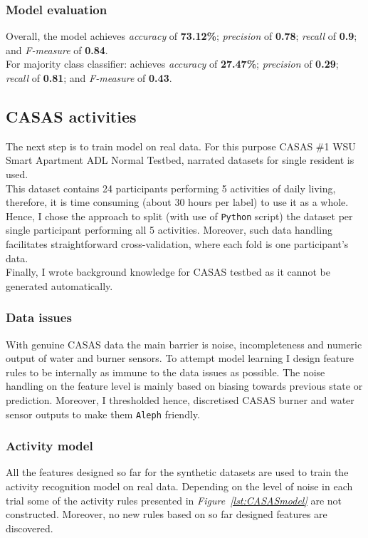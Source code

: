 \documentclass[10pt, a4paper, pdflatex, leqno, twoside, openright]{report}
\begin{document}
      \subsubsection{Model evaluation}
Overall, the model achieves \emph{accuracy} of \textbf{73.12\%}; \emph{precision} of \textbf{0.78}; \emph{recall} of \textbf{0.9}; and \emph{F-measure} of \textbf{0.84}.\\

For majority class classifier: achieves \emph{accuracy} of \textbf{27.47\%}; \emph{precision} of \textbf{0.29}; \emph{recall} of \textbf{0.81}; and \emph{F-measure} of \textbf{0.43}.

    \subsection{CASAS activities}
The next step is to train model on real data. For this purpose CASAS \#1 WSU Smart Apartment ADL Normal Testbed, narrated datasets for single resident is used.\\
This dataset contains 24 participants performing 5 activities of daily living, therefore, it is time consuming (about 30 hours per label) to use it as a whole. Hence, I chose the approach to split (with use of \texttt{Python} script) the dataset per single participant performing all 5 activities. Moreover, such data handling facilitates straightforward cross-validation, where each fold is one participant's data.\\
Finally, I wrote background knowledge for CASAS testbed as it cannot be generated automatically.

      \subsubsection{Data issues}
With genuine CASAS data the main barrier is noise, incompleteness and numeric output of water and burner sensors. To attempt model learning I design feature rules to be internally as immune to the data issues as possible. The noise handling on the feature level is mainly based on biasing towards previous state or prediction. Moreover, I thresholded hence, discretised CASAS burner and water sensor outputs to make them \texttt{Aleph} friendly.

      \subsubsection{Activity model}
All the features designed so far for the synthetic datasets are used to train the activity recognition model on real data. Depending on the level of noise in each trial some of the activity rules presented in \emph{Figure~\ref{lst:CASASmodel}} are not constructed. Moreover, no new rules based on so far designed features are discovered.
\end{document}
